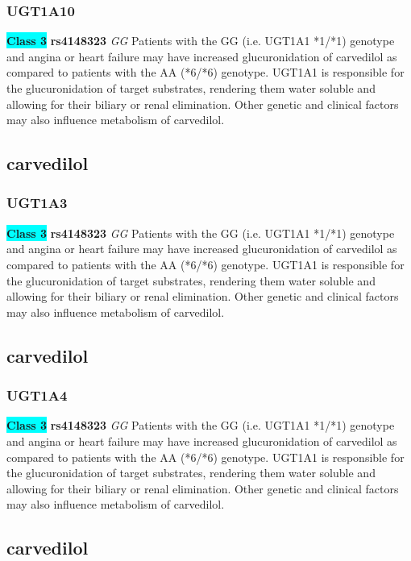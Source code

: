 \documentclass{book}
\begin{document}
\subsubsection{ UGT1A10 }

\begin{center}
\textbf{\colorbox{cyan} {Class 3}} \textbf{ rs4148323 } \textit{ GG }
Patients with the GG (i.e. UGT1A1 *1/*1) genotype and angina or heart failure may have increased glucuronidation of carvedilol as compared to patients with the AA (*6/*6) genotype. UGT1A1 is responsible for the glucuronidation of target substrates, rendering them water soluble and allowing for their biliary or renal elimination. Other genetic and clinical factors may also influence metabolism of carvedilol.


\end{center}\subsection{ carvedilol }


\subsubsection{ UGT1A3 }

\begin{center}
\textbf{\colorbox{cyan} {Class 3}} \textbf{ rs4148323 } \textit{ GG }
Patients with the GG (i.e. UGT1A1 *1/*1) genotype and angina or heart failure may have increased glucuronidation of carvedilol as compared to patients with the AA (*6/*6) genotype. UGT1A1 is responsible for the glucuronidation of target substrates, rendering them water soluble and allowing for their biliary or renal elimination. Other genetic and clinical factors may also influence metabolism of carvedilol.


\end{center}\subsection{ carvedilol }


\subsubsection{ UGT1A4 }

\begin{center}
\textbf{\colorbox{cyan} {Class 3}} \textbf{ rs4148323 } \textit{ GG }
Patients with the GG (i.e. UGT1A1 *1/*1) genotype and angina or heart failure may have increased glucuronidation of carvedilol as compared to patients with the AA (*6/*6) genotype. UGT1A1 is responsible for the glucuronidation of target substrates, rendering them water soluble and allowing for their biliary or renal elimination. Other genetic and clinical factors may also influence metabolism of carvedilol.


\end{center}\subsection{ carvedilol }
\end{document}
